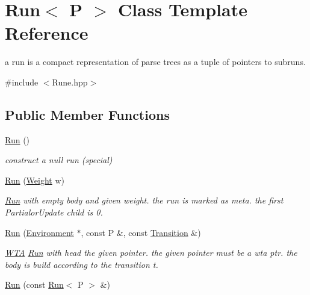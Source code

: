 \hypertarget{classRun}{}\section{Run$<$ P $>$ Class Template Reference}
\label{classRun}


a run is a compact representation of parse trees as a tuple of pointers to subruns.  




{\ttfamily \#include $<$Rune.\+hpp$>$}

\subsection*{Public Member Functions}
\begin{DoxyCompactItemize}
\item 
\mbox{\label{classRun_ae8145f85e985d5ff3aa118bd99901675}} 
\mbox{\hyperlink{classRun_ae8145f85e985d5ff3aa118bd99901675}{Run}} ()
\begin{DoxyCompactList}\small\item\em construct a null run (special) \end{DoxyCompactList}\item 
\mbox{\hyperlink{classRun_a63172061ee2c7c601f13d4ef3f3a67bd}{Run}} (\mbox{\hyperlink{classWeight}{Weight}} w)
\begin{DoxyCompactList}\small\item\em \mbox{\hyperlink{classRun}{Run}} with empty body and given weight. the run is marked as meta. the first Partialor\+Update child is 0. \end{DoxyCompactList}\item 
\mbox{\hyperlink{classRun_a0a075a813930403154728bcea9062a55}{Run}} (\mbox{\hyperlink{classEnvironment}{Environment}} $\ast$, const P \&, const \mbox{\hyperlink{classTransition}{Transition}} \&)
\begin{DoxyCompactList}\small\item\em \mbox{\hyperlink{classWTA}{W\+TA}} \mbox{\hyperlink{classRun}{Run}} with head the given pointer. the given pointer must be a wta ptr. the body is build according to the transition t. \end{DoxyCompactList}\item 
\mbox{\label{classRun_a1ffdaf6f1209f5692898af9142ff0168}} 
\mbox{\hyperlink{classRun_a1ffdaf6f1209f5692898af9142ff0168}{Run}} (const \mbox{\hyperlink{classRun}{Run}}$<$ P $>$ \&)

\end{DoxyCompactItemize}
